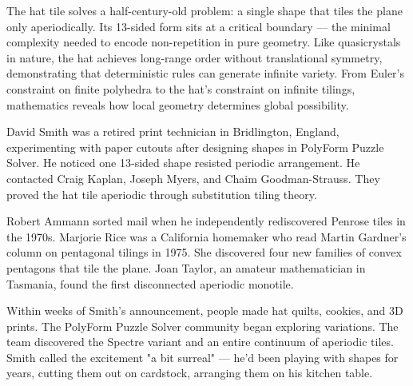The hat tile solves a half-century-old problem: a single shape that tiles the plane only aperiodically. Its 13-sided form sits at a critical boundary — the minimal complexity needed to encode non-repetition in pure geometry. Like quasicrystals in nature, the hat achieves long-range order without translational symmetry, demonstrating that deterministic rules can generate infinite variety. From Euler's constraint on finite polyhedra to the hat's constraint on infinite tilings, mathematics reveals how local geometry determines global possibility.

\begin{commentary}
David Smith was a retired print technician in Bridlington, England, experimenting with paper cutouts after designing shapes in PolyForm Puzzle Solver. He noticed one 13-sided shape resisted periodic arrangement. He contacted Craig Kaplan, Joseph Myers, and Chaim Goodman-Strauss. They proved the hat tile aperiodic through substitution tiling theory.

Robert Ammann sorted mail when he independently rediscovered Penrose tiles in the 1970s. Marjorie Rice was a California homemaker who read Martin Gardner's column on pentagonal tilings in 1975. She discovered four new families of convex pentagons that tile the plane. Joan Taylor, an amateur mathematician in Tasmania, found the first disconnected aperiodic monotile.

Within weeks of Smith's announcement, people made hat quilts, cookies, and 3D prints. The PolyForm Puzzle Solver community began exploring variations. The team discovered the Spectre variant and an entire continuum of aperiodic tiles. Smith called the excitement "a bit surreal" — he'd been playing with shapes for years, cutting them out on cardstock, arranging them on his kitchen table. 

\end{commentary}

\newpage

